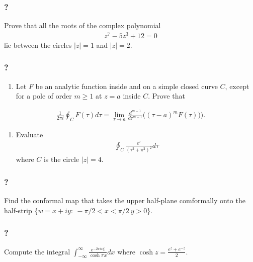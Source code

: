 \hypertarget{section-190}{%
\subsubsection{?}\label{section-190}}

Prove that all the roots of the complex polynomial
\begin{align*}z^7 - 5 z^3 +12 =0\end{align*}
lie between the circles \(|z|=1\) and \(|z|=2\).

\hypertarget{section-191}{%
\subsubsection{?}\label{section-191}}

\begin{enumerate}
\def\labelenumi{(\alph{enumi})}
\tightlist
\item
  Let \(F\) be an analytic function inside and on a simple closed curve
  \(C\), except for a pole of order \(m\geq 1\) at \(z=a\) inside \(C\).
  Prove that
\end{enumerate}

\begin{align*}\frac{1}{2 \pi i}\oint_{C} F(\tau) d\tau = 
\lim_{\tau\rightarrow a} \frac{d^{m-1}}{d\tau^{m-1}}\big((\tau-a)^m F(\tau))\big).\end{align*}

\begin{enumerate}
\def\labelenumi{(\alph{enumi})}
\setcounter{enumi}{1}
\tightlist
\item
  Evaluate
  \begin{align*}\oint_{C}\frac{e^{\tau}}{(\tau^2+\pi^2)^2}d\tau\end{align*}
  where \(C\) is the circle \(|z|=4\).
\end{enumerate}

\hypertarget{section-192}{%
\subsubsection{?}\label{section-192}}

Find the conformal map that takes the upper half-plane comformally onto
the half-strip \(\{ w=x+iy:\ -\pi/2<x<\pi/2\ y>0\}\).

\hypertarget{section-193}{%
\subsubsection{?}\label{section-193}}

Compute the integral
\(\displaystyle{\int_{-\infty}^{\infty} \frac{e^{-2\pi ix\xi}}{\cosh\pi x}dx}\)
where \(\displaystyle{\cosh z=\frac{e^{z}+e^{-z}}{2}}\).


\printbibliography[title=Bibliography]



